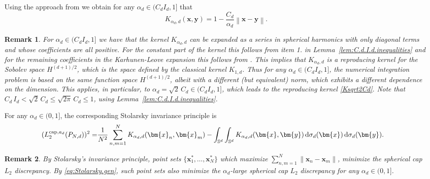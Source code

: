 \documentclass[12pt]{article}
\newcommand{\cp}{{\rm cap}}
\newtheorem{remark}{Remark}
\begin{document}
Using the approach from \cite[Section~2]{BD13a} we obtain for any $\alpha_d \in (C_d I_d, 1]$ that
\begin{equation}\label{Kalpha}
K_{\alpha_d,d}(\bm{x}, \bm{y}) = 1 - \frac{C_d}{\alpha_d} \left\|\bm{x} - \bm{y} \right\|.
\end{equation}

\begin{remark}\rm\label{rm_rk}
For $\alpha_d \in (C_d I_d,1]$ we have that the kernel $K_{\alpha_d,d}$ can be expanded as a series in spherical harmonics with only diagonal terms and whose coefficients are all positive. For the constant part of the kernel this follows from item 1. in Lemma~\ref{lem:C.d.I.d.inequalities} and for the remaining coefficients in the Karhunen-Leove expansion this follows from \cite{BD13a}. This implies that $K_{\alpha_d,d}$ is a reproducing kernel for the Sobolev space $H^{(d+1)/2}$, which is the space defined by the classical kernel $K_{1,d}$. Thus for any $\alpha_d \in (C_d I_d, 1]$, the numerical integration problem is based on the same function space $H^{(d+1)/2}$, albeit with a different (but equivalent) norm, which exhibits a different dependence on the dimension. This applies, in particular, to $\alpha_d = \sqrt{2} \, C_d \in (C_d I_d, 1]$, which leads to the reproducing kernel \eqref{Ksqrt2Cd}. Note that $C_d \, I_d < \sqrt{2} \, C_d \le \sqrt{2\pi} \, C_d \le 1$, using Lemma~\ref{lem:C.d.I.d.inequalities}.
\end{remark}

For any $\alpha_d \in (0,1]$, the corresponding Stolarsky invariance principle is
\begin{equation}
\label{eq:Stolarsky.gen}
\begin{split}
(L_2^{\cp,a_d}(P_{N,d}))^2 =&  \frac{1}{N^2} \sum_{n,m=1}^N K_{\alpha_d,d}(\bm{x}_n, \bm{x}_m) - \int_{\mathbb{S}^d} \int_{\mathbb{S}^d} K_{\alpha_d,d}(\bm{x}, \bm{y}) \,\mathrm{d} \sigma_d(\bm{x}) \,\mathrm{d} \sigma_d(\bm{y}).
\end{split}
\end{equation}


\begin{remark}\rm
By Stolarsky's invariance principle, point sets $\{\bm{x}_1^*, \ldots, \bm{x}_N^*\}$ which maximize $\sum_{n,m=1}^N \|\bm{x}_n - \bm{x}_m\|$, minimize the spherical cap $L_2$ discrepancy. By \eqref{eq:Stolarsky.gen}, such point sets also minimize the $\alpha_d$-large spherical cap $L_2$ discrepancy for any $\alpha_d \in (0,1]$.
\end{remark}
\end{document}
